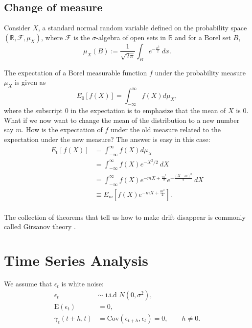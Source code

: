 \documentclass{amsart}
\theoremstyle{plain}
\numberwithin{equation}{section}
\begin{document}
\subsection*{Change of measure}
Consider $X$, a standard normal 
random variable defined on the 
probability space $(\mathbb{R}, \mathcal{F}, \mu_X)$, where
$\mathcal{F}$ is the $\sigma$-algebra 
of open sets in $\mathbb{R}$ and
for a Borel set $B$,
\begin{equation*}
\mu_X(B) := \frac{1}{\sqrt{2 \pi} }
\int_{B} e^{-\frac{x^2}{2}} \: dx.
\end{equation*}

The expectation of a Borel measurable function 
$f$ under the probability measure 
$\mu_X$ is given as
\begin{equation*}
E_0[f(X)] = \int_{-\infty}^{\infty} f(X) d\mu_X,
\end{equation*}
where the subscript $0$ in the expectation is to 
emphasize that the mean of $X$ is $0$. What if
we now want to change the mean of the distribution
to a new number say $m$. How is the expectation of
$f$ under the old measure related to the 
expectation under the new measure?
The answer is easy in this case:
\begin{align*}
E_0[f(X)] &= \int_{-\infty}^{\infty} f(X) d\mu_X \\
					&= \int_{-\infty}^{\infty} f(X) e^{-X^2/2} \: dX \\
					&= \int_{-\infty}^{\infty} f(X) e^{-mX + \frac{m^2}{2}}e^{-\frac{(X-m)^2}{2}} \: dX \\
					&\equiv E_m\left[f(X)e^{-mX + \frac{m^2}{2}}\right].\\
\end{align*}


The collection of theorems that tell us how to make 
drift disappear is commonly called Girsanov theory
\cite[Ch.\ 13]{steele2001stochastic}.

\section{Time Series Analysis}
We assume that $\epsilon_t$ is white noise:
\begin{align*}
\epsilon_t &\sim \textrm{ i.i.d } N(0, \sigma^2),\\
\mathrm{E}(\epsilon_t) &= 0,\\
\gamma_\epsilon(t+h, t) &= \mathrm{Cov}(\epsilon_{t+h}, \epsilon_t) = 0, \qquad h \neq 0.
\end{align*}
\end{document}
